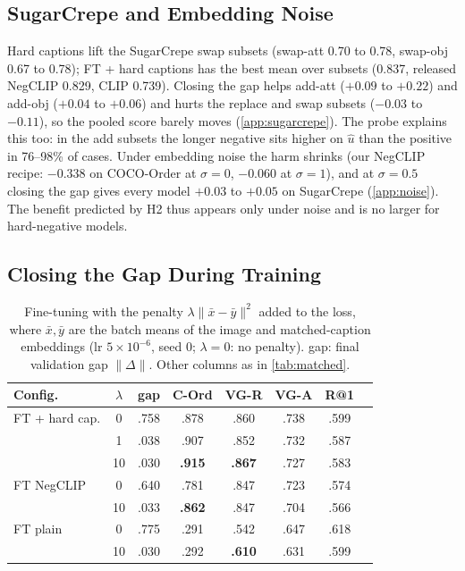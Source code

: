 \documentclass{article}
\newcommand{\uhat}{\hat{u}}
\newcommand{\gapnorm}{\lVert\Delta\rVert}
\begin{document}
\subsection{SugarCrepe and Embedding Noise}

Hard captions lift the SugarCrepe swap subsets (swap-att 0.70 to 0.78, swap-obj 0.67 to 0.78); FT + hard captions has the best mean over subsets (0.837, released NegCLIP 0.829, CLIP 0.739). Closing the gap helps add-att ($+0.09$ to $+0.22$) and add-obj ($+0.04$ to $+0.06$) and hurts the replace and swap subsets ($-0.03$ to $-0.11$), so the pooled score barely moves (\cref{app:sugarcrepe}). The probe explains this too: in the add subsets the longer negative sits higher on $\uhat$ than the positive in 76--98\% of cases. Under embedding noise the harm shrinks (our NegCLIP recipe: $-0.338$ on COCO-Order at $\sigma{=}0$, $-0.060$ at $\sigma{=}1$), and at $\sigma{=}0.5$ closing the gap gives every model $+0.03$ to $+0.05$ on SugarCrepe (\cref{app:noise}). The benefit predicted by H2 thus appears only under noise and is no larger for hard-negative models.

\subsection{Closing the Gap During Training}

\begin{table}[t]
\caption{Fine-tuning with the penalty $\lambda\lVert\bar x-\bar y\rVert^2$ added to the loss, where $\bar x,\bar y$ are the batch means of the image and matched-caption embeddings (lr $5{\times}10^{-6}$, seed 0; $\lambda{=}0$: no penalty). gap: final validation gap $\gapnorm$. Other columns as in \cref{tab:matched}.}
\label{tab:gapreg}
\begin{center}
\begin{small}
\setlength{\tabcolsep}{3.5pt}
\begin{tabular}{lccccccc}
\toprule
Config. & $\lambda$ & gap & C-Ord & VG-R & VG-A & R@1 \\
\midrule
FT + hard cap. & 0 & .758 & .878 & .860 & .738 & .599 \\
 & 1 & .038 & .907 & .852 & .732 & .587 \\
 & 10 & .030 & \textbf{.915} & \textbf{.867} & .727 & .583 \\
\midrule
FT NegCLIP & 0 & .640 & .781 & .847 & .723 & .574 \\
 & 10 & .033 & \textbf{.862} & .847 & .704 & .566 \\
\midrule
FT plain & 0 & .775 & .291 & .542 & .647 & .618 \\
 & 10 & .030 & .292 & \textbf{.610} & .631 & .599 \\
\bottomrule
\end{tabular}
\end{small}
\end{center}
\vskip -0.2in
\end{table}
\end{document}
